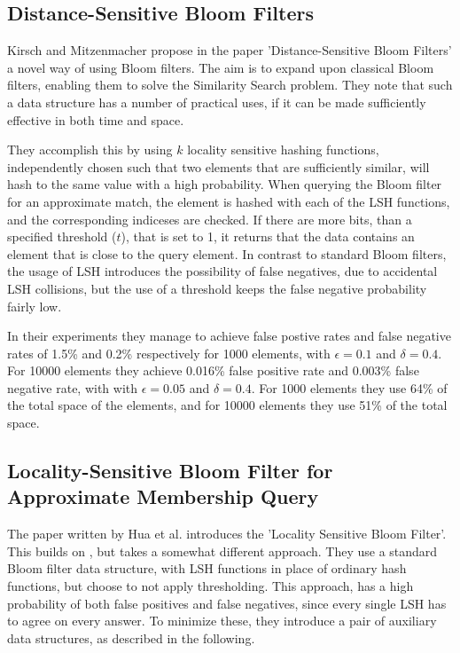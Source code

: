 \documentclass[a4paper,11pt]{article}
\begin{document}
\subsection{Distance-Sensitive Bloom Filters}
Kirsch and Mitzenmacher propose in the paper 'Distance-Sensitive Bloom Filters'\cite{paper:harvard} a novel way of using Bloom filters. The aim is to expand upon classical Bloom filters, enabling them to solve the Similarity Search problem. They note that such a data structure has a number of practical uses, if it can be made sufficiently effective in both time and space.

They accomplish this by using $k$ locality sensitive hashing functions, independently chosen such that two elements that are sufficiently similar, will hash to the same value with a high probability.
When querying the Bloom filter for an approximate match, the element is hashed with each of the LSH functions, and the corresponding indiceses are checked. If there are more bits, than a specified threshold ($t$), that is set to 1, it returns that the data contains an element that is close to the query element. In contrast to standard Bloom filters, the usage of LSH introduces the possibility of false negatives, due to accidental LSH collisions, but the use of a threshold keeps the false negative probability fairly low.

In their experiments they manage to achieve false postive rates and false negative rates of 1.5\% and 0.2\% respectively for 1000 elements, with $\epsilon = 0.1$ and $\delta = 0.4$. For 10000 elements they achieve 0.016\% false positive rate and 0.003\% false negative rate, with with $\epsilon = 0.05$ and $\delta = 0.4$. For 1000 elements they use 64\% of the total space of the elements, and for 10000 elements they use 51\% of the total space.

\subsection{Locality-Sensitive Bloom Filter for Approximate Membership Query}
The paper written by Hua et al.\cite{paper:hua} introduces the 'Locality Sensitive Bloom Filter'. This builds on \cite{paper:harvard}, but takes a somewhat different approach. They use a standard Bloom filter data structure, with LSH functions in place of ordinary hash functions, but choose to not apply thresholding. This approach, has a high probability of both false positives and false negatives, since every single LSH has to agree on every answer. To minimize these, they introduce a pair of auxiliary data structures, as described in the following.
\end{document}
